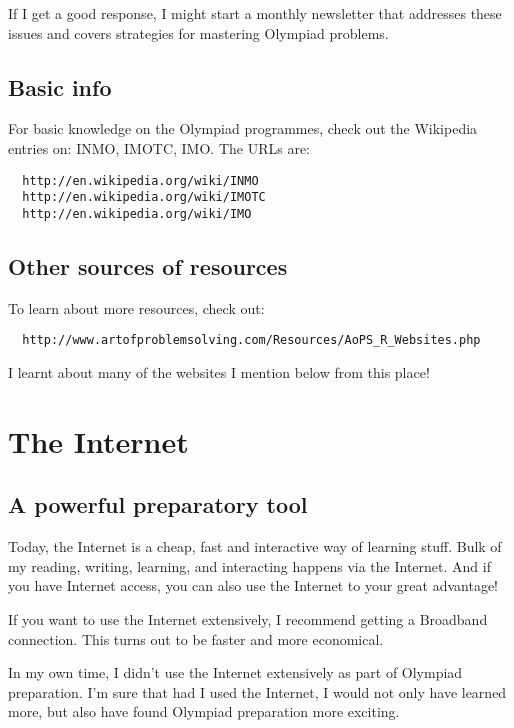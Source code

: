 \documentclass[a4paper]{amsart}
\begin{document}
If I get a good response, I might start a monthly newsletter that addresses these issues and covers strategies for mastering
Olympiad problems.

\subsection{Basic info}

For basic knowledge on the Olympiad programmes, check out the Wikipedia entries on: INMO, IMOTC, IMO. The URLs are:
\begin{verbatim}
  http://en.wikipedia.org/wiki/INMO
  http://en.wikipedia.org/wiki/IMOTC
  http://en.wikipedia.org/wiki/IMO
\end{verbatim}

\subsection{Other sources of resources}

To learn about more resources, check out:

\begin{verbatim}
  http://www.artofproblemsolving.com/Resources/AoPS_R_Websites.php
\end{verbatim}

I learnt about many of the websites I mention below from this place!

\section{The Internet}

\subsection{A powerful preparatory tool}

Today, the Internet is a cheap, fast and interactive way of learning stuff. Bulk of my
reading, writing, learning, and interacting happens via the Internet. And if you have Internet access, you can also use the Internet
to your great advantage!

If you want to use the Internet extensively, I recommend getting a Broadband connection. This turns out to be 
faster and more economical.

In my own time, I didn't use the Internet extensively as part of Olympiad preparation. I'm sure that had I used the Internet, I would not
only have learned more, but also have found Olympiad preparation more exciting.
\end{document}
